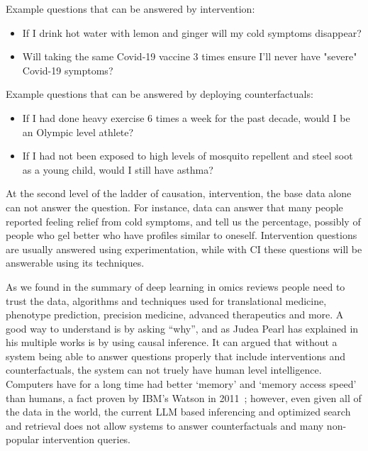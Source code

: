 Example questions that can be answered by intervention:
\begin{itemize}
    \item If I drink hot water with lemon and ginger will my cold symptoms disappear?
    \item Will taking the same Covid-19 vaccine 3 times ensure I'll never have "severe" Covid-19 symptoms?
\end{itemize}

Example questions that can be answered by deploying counterfactuals:
\begin{itemize}
    \item If I had done heavy exercise 6 times a week for the past decade, would I be an Olympic level athlete?
    \item If I had not been exposed to high levels of mosquito repellent and steel soot as a young child, would I still have asthma?
\end{itemize}

At the second level of the ladder of causation, intervention, the base data alone can not answer the question.
For instance, data can answer that many people reported feeling relief from cold symptoms, and tell us the percentage, possibly of people who gel better who have profiles similar to oneself.
Intervention questions are usually answered using experimentation, while with CI these questions will be answerable using its techniques.

As we found in the summary of deep learning in omics reviews people need to trust the data, algorithms and techniques used for translational medicine, phenotype prediction, precision medicine, advanced therapeutics and more.
A good way to understand is by asking ``why'', and as Judea Pearl \cite{Pearl:1995,Pearl:2009,Pearl:2019} has explained in his multiple works is by using causal inference.
It can argued that without a system being able to answer questions properly that include interventions and counterfactuals, the system can not truely have human level intelligence.
Computers have for a long time had better `memory' and `memory access speed' than humans, a fact proven by IBM's Watson in 2011~\cite{Ferrucci:2010_watson}; however, even given all of the data in the world, the current LLM based inferencing and optimized search and retrieval does not allow systems to answer counterfactuals and many non-popular intervention queries.
